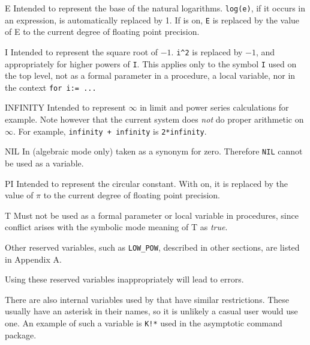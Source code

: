 \begin{list}{}{\renewcommand{\makelabel}[1]{\texttt{#1}\hspace{\fill}}%
               \setlength{\labelsep}{1em}%
               }
\item[E] Intended to represent the base of
the natural logarithms.  \texttt{log(e)}, if it occurs in an expression, is
automatically replaced by 1.  If  is
on, \texttt{E} is replaced by the value of E to the current degree of
floating point precision.

\item[I] Intended to represent the square
root of $-1$. \texttt{i\textasciicircum2} is replaced by $-1$, and
appropriately for higher powers of \texttt{I}.  This applies only to the
symbol \texttt{I} used on the top
level, not as a formal parameter in a procedure, a local variable, nor in
the context \texttt{for i:= ...}

\item[INFINITY] Intended to represent $\infty$
in limit and power series calculations for example.  Note however that the
current system does \emph{not} do proper arithmetic on $\infty$.  For example,
\texttt{infinity + infinity} is \texttt{2*infinity}.

\item[NIL] In {\REDUCE} (algebraic mode only)
taken as a synonym for zero.  Therefore \texttt{NIL} cannot be used as a
variable.

\item[PI] Intended to represent the circular
constant.  With  on, it is replaced by the value of $\pi$ to
the current degree of floating point precision.

\item[T] Must not be used as a formal
parameter or local variable in procedures, since conflict arises with the
symbolic mode meaning of T as \emph{true}.
\end{list}

Other reserved variables, such as \texttt{LOW\_POW}, described in other sections,
are listed in Appendix A.

Using these reserved variables inappropriately
will lead to errors.

There are also internal variables used by {\REDUCE} that have similar
restrictions. These usually have an asterisk in their names, so it is
unlikely a casual user would use one. An example of such a variable is
\texttt{K!*} used in the asymptotic command package.

